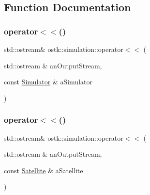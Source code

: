 \subsection{Function Documentation}
\mbox{\label{namespaceostk_1_1simulation_ac688118495593f25aeed155ae2da4f2c}} 
\subsubsection{\texorpdfstring{operator$<$$<$()}{operator<<()}\hspace{0.1cm}{\footnotesize\ttfamily [1/3]}}
{\footnotesize\ttfamily std\+::ostream\& ostk\+::simulation\+::operator$<$$<$ (\begin{DoxyParamCaption}\item[{std\+::ostream \&}]{an\+Output\+Stream,  }\item[{const \hyperlink{classostk_1_1simulation_1_1_simulator}{Simulator} \&}]{a\+Simulator }\end{DoxyParamCaption})}

\mbox{\label{namespaceostk_1_1simulation_ae6f39d8d153b897714c1d305f2077a5a}} 
\subsubsection{\texorpdfstring{operator$<$$<$()}{operator<<()}\hspace{0.1cm}{\footnotesize\ttfamily [2/3]}}
{\footnotesize\ttfamily std\+::ostream\& ostk\+::simulation\+::operator$<$$<$ (\begin{DoxyParamCaption}\item[{std\+::ostream \&}]{an\+Output\+Stream,  }\item[{const \hyperlink{classostk_1_1simulation_1_1_satellite}{Satellite} \&}]{a\+Satellite }\end{DoxyParamCaption})}

\mbox{\label{namespaceostk_1_1simulation_af73818b9147e934ef1e008c0a731d0b8}} 
